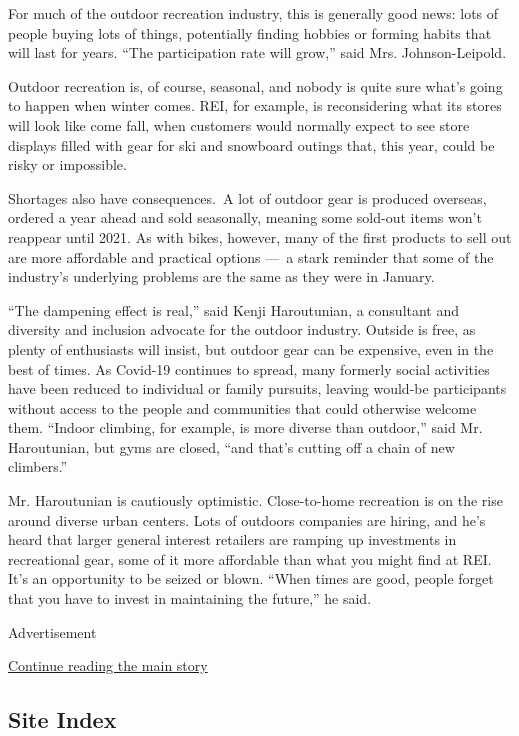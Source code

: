 For much of the outdoor recreation industry, this is generally good
news: lots of people buying lots of things, potentially finding hobbies
or forming habits that will last for years. ``The participation rate
will grow,'' said Mrs. Johnson-Leipold.

Outdoor recreation is, of course, seasonal, and nobody is quite sure
what's going to happen when winter comes. REI, for example, is
reconsidering what its stores will look like come fall, when customers
would normally expect to see store displays filled with gear for ski and
snowboard outings that, this year, could be risky or impossible.

Shortages also have consequences.~A lot of outdoor gear is produced
overseas, ordered a year ahead and sold seasonally, meaning some
sold-out items won't reappear until 2021. As with bikes, however, many
of the first products to sell out are more affordable and practical
options ---~a stark reminder that some of the industry's underlying
problems are the same as they were in January.

``The dampening effect is real,'' said Kenji Haroutunian, a consultant
and diversity and inclusion advocate for the outdoor industry. Outside
is free, as plenty of enthusiasts will insist, but outdoor gear can be
expensive, even in the best of times. As Covid-19 continues to spread,
many formerly social activities have been reduced to individual or
family pursuits, leaving would-be participants without access to the
people and communities that could otherwise welcome them. ``Indoor
climbing, for example, is more diverse than outdoor,'' said Mr.
Haroutunian, but gyms are closed, ``and that's cutting off a chain of
new climbers.''

Mr. Haroutunian is cautiously optimistic. Close-to-home recreation is on
the rise around diverse urban centers. Lots of outdoors companies are
hiring, and he's heard that larger general interest retailers are
ramping up investments in recreational gear, some of it more affordable
than what you might find at REI. It's an opportunity to be seized or
blown. ``When times are good, people forget that you have to invest in
maintaining the future,'' he said.

Advertisement

\protect\hyperlink{after-bottom}{Continue reading the main story}

\hypertarget{site-index}{%
\subsection{Site Index}\label{site-index}}

